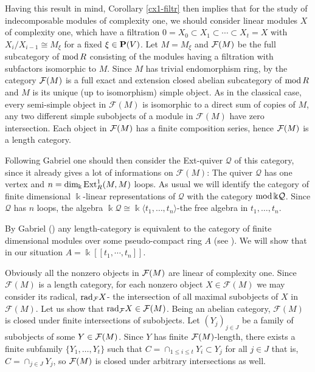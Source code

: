\documentclass[10pt]{amsart}
\begin{document}
\medskip
\noindent  Having this result in mind, Corollary \ref{cx1-filtr} then implies that for the study of
indecomposable modules of complexity one, we should consider linear modules $X$ of complexity
one, which have a filtration $0=X_0 \subset X_1 \subset \cdots \subset X_t = X$ with  
$X_i/X_{i-1} \cong M_{\xi}$ for a fixed $\xi \in {\bf P}(V)$. Let $M=M_{\xi}$ and $\mathcal F (M) $ be the full subcategory of 
$\operatorname{mod} R$
consisting of the modules having a filtration with subfactors isomorphic to $M$. Since $M$ 
has trivial endomorphism ring, by \cite{R1} the category $\mathcal F (M)$ is a full exact and extension closed  abelian subcategory of  $\operatorname{mod} R$
and $M$ is its unique (up to isomorphism) simple object. As in the classical case, every semi-simple object in $\mathcal F(M)$ is isomorphic to a direct sum of copies of $M$, any two different simple subobjects of a module in $\mathcal F(M)$ have zero intersection. Each object in $\mathcal F (M)$ has a finite composition series,
hence $\mathcal F (M)$ is a length category.

\medskip
\noindent Following Gabriel \cite[Sect.7]{G1} one should
then consider the Ext-quiver $\mathcal Q$ of this category, since it already gives a lot of informations
on $\mathcal F(M )$: 
 The quiver $\mathcal Q$ has one vertex and  $n = \mbox{dim}_{\Bbbk}\operatorname{Ext}\nolimits_R^1(M,M)$ loops.
 As usual we will identify the category of finite dimensional $\Bbbk$-linear representations
of $\mathcal Q$ with the category $\operatorname{mod}\Bbbk\mathcal Q$.  Since $\mathcal Q$ has $n$ loops, 
the algebra $\Bbbk\mathcal Q \cong \Bbbk\langle t_1,\ldots ,t_n\rangle $-the free algebra in $t_1, \ldots , t_n$.
\smallskip

\noindent By Gabriel (\cite{G1}) any length-category is equivalent to
the category of finite dimensional modules over some pseudo-compact ring $A$ (see \cite{G2}). We will show that in our situation $A = \Bbbk[[t_1,\cdots,t_n]]$. 


\smallskip
\noindent Obviously all the nonzero objects in $\mathcal F (M)$ are linear of complexity 
one. 
Since $\mathcal F(M)$ is a length category, for  each nonzero object $X\in\mathcal F(M)$ we may consider its radical,
$\mbox{rad}_{\mathcal F} X$- the intersection of all maximal subobjects of $X$ in $\mathcal F(M)$. Let us show that $\mbox{rad}_{\mathcal F} X\in\mathcal F(M)$. Being an abelian category, $\mathcal F(M)$ is closed under finite intersections of subobjects. Let $(Y_j)_{j\in J}$ be a family of subobjects of some $Y\in \mathcal F (M)$. Since $Y$ has finite $\mathcal F (M)$-length, there exists a finite subfamily
$\{Y_1,\ldots ,Y_t\}$ such that $C =\cap_{1\leq i \leq t}Y_i \subset Y_j$ for all $j\in J$ that is, $C = \cap_{j\in J}Y_j$, so $\mathcal F (M)$ is closed under arbitrary intersections as well.
\medskip
\end{document}
